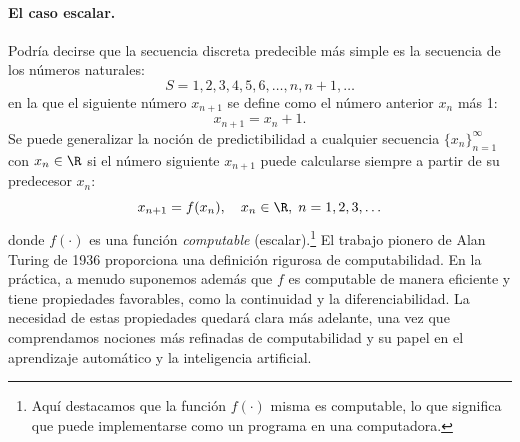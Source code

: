 \documentclass[../../book-main_es.tex]{subfiles}
\begin{document}
\paragraph{El caso escalar.} Podría decirse que la secuencia discreta 
predecible más simple es la secuencia de los números naturales:
\begin{equation}
    S = 1, 2, 3, 4, 5, 6, \ldots, n, n+1, \ldots
\end{equation}
en la que el siguiente número \(x_{n+1}\) se define como el número anterior
\(x_{n}\) más 1:
\begin{equation}
    x_{n+1} = x_{n} + 1.
\end{equation}
Se puede generalizar la noción de predictibilidad a cualquier secuencia
\(\{x_{n}\}_{n=1}^{\infty}\) con \(x_{n} \in \R\) si el número siguiente 
\(x_{n+1}\) puede calcularse siempre a partir de su predecesor \(x_{n}\):
\begin{equation}
    x_{n+1} = f(x_{n}), \quad x_{n} \in \R, \; n = 1, 2, 3, \ldots
\end{equation}
donde \(f(\cdot)\) es una función \textit{computable} 
(escalar).\footnote{Aquí destacamos que la función \(f(\cdot)\) misma 
es computable, lo que significa que puede implementarse como un programa 
en una computadora.} El trabajo pionero de Alan Turing de 1936 
\cite{Turing-1936} proporciona una definición rigurosa de computabilidad. 
En la práctica, a menudo suponemos además que \(f\) es computable de 
manera eficiente y tiene propiedades favorables, como la continuidad 
y la diferenciabilidad. La necesidad de estas propiedades
quedará clara más adelante, una vez que comprendamos nociones más
refinadas de computabilidad y su papel en el aprendizaje automático
y la inteligencia artificial.
\end{document}
